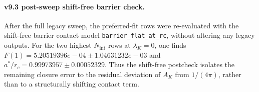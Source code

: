 \paragraph{v9.3 post-sweep shift-free barrier check.}
After the full legacy sweep, the preferred-fit rows were re-evaluated with the shift-free barrier contact model \texttt{barrier\_flat\_at\_rc}, without altering any legacy outputs. For the two highest $N_{\mathrm{int}}$ rows at $\lambda_K=0$, one finds $F(1) = 5.20519396e-04 \pm 1.04631232e-03$ and $a^*/r_c = 0.99973957 \pm 0.00052329$. Thus the shift-free postcheck isolates the remaining closure error to the residual deviation of $A_K$ from $1/(4\pi)$, rather than to a structurally shifting contact term.
